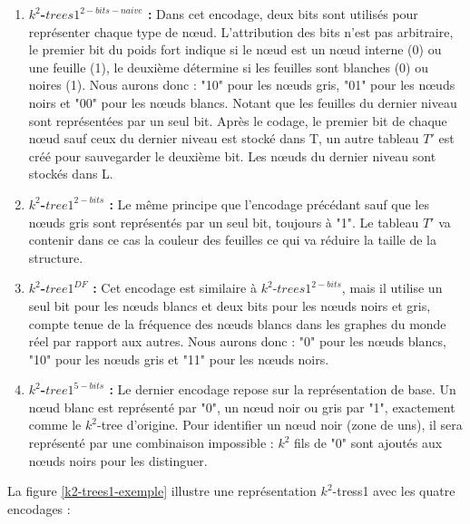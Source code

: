 \begin{enumerate}[label=$\bullet$]
\item \textbf{ $k^2$-$trees1^{2-bits-naive}$ :} Dans cet encodage, deux bits sont utilisés pour représenter chaque type de nœud. L'attribution des bits n'est pas arbitraire, le premier bit du poids fort indique si le nœud est un nœud interne (0) ou une feuille (1), le deuxième détermine si les feuilles sont blanches (0) ou noires (1). Nous aurons donc : "10" pour les nœuds gris, "01" pour les nœuds noirs et "00" pour les nœuds blancs. Notant que les feuilles du dernier niveau sont représentées par un seul bit.
Après le codage, le premier bit de chaque nœud sauf ceux du dernier niveau est stocké dans T, un autre tableau $T'$ est créé pour sauvegarder le deuxième bit. Les nœuds du dernier niveau sont stockés dans L.
\item \textbf{ $k^2$-$tree1^{2-bits}$ :} Le même principe que l'encodage précédant sauf que les nœuds gris sont représentés par un seul bit, toujours à "1". Le tableau $T'$ va contenir dans ce cas la couleur des feuilles ce qui va réduire la taille de la structure.

\item \textbf{ $k^2$-$tree1^{DF}$ :} Cet encodage est similaire à $k^2$-$trees1^{2-bits}$, mais il utilise un seul bit pour les nœuds blancs et deux bits pour les nœuds noirs et gris, compte tenue de la fréquence des nœuds blancs dans les graphes du monde réel par rapport aux autres. Nous aurons donc : "0" pour les nœuds blancs, "10" pour les nœuds gris et "11" pour les nœuds noirs.

\item \textbf{ $k^2$-$tree1^{5-bits}$ :} Le dernier encodage repose sur la représentation de base. Un nœud blanc est représenté par "0", un nœud noir ou gris par "1", exactement comme le $k^2$-tree d'origine. Pour identifier un nœud noir (zone de uns), il sera représenté par une combinaison impossible : $k^2$ fils de "0" sont ajoutés aux nœuds noirs pour les distinguer.
\end{enumerate}


La figure \ref{k2-trees1-exemple} illustre une représentation $k^2$-tress1 avec les quatre encodages \citep{de2014new} : 


